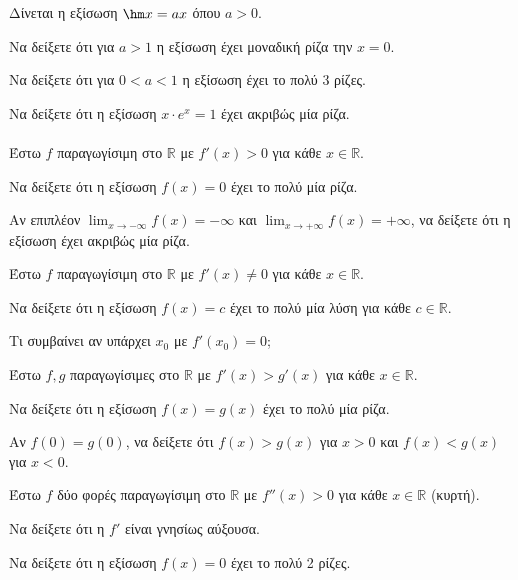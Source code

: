 \documentclass[11pt,a4paper,modern]{FFExercises}
\begin{document}
\askhsh
Δίνεται η εξίσωση $\hm x = ax$ όπου $a > 0$.
\begin{alist}
  \item Να δείξετε ότι για $a > 1$ η εξίσωση έχει μοναδική ρίζα την $x = 0$.
  \item Να δείξετε ότι για $0 < a < 1$ η εξίσωση έχει το πολύ 3 ρίζες.
\end{alist}

\askhsh
Να δείξετε ότι η εξίσωση $x \cdot e^x = 1$ έχει ακριβώς μία ρίζα.\\\\


\askhsh
Έστω $f$ παραγωγίσιμη στο $\mathbb{R}$ με $f'(x) > 0$ για κάθε $x \in \mathbb{R}$.
\begin{alist}
  \item Να δείξετε ότι η εξίσωση $f(x) = 0$ έχει το πολύ μία ρίζα.
  \item Αν επιπλέον $\displaystyle\lim_{x \to -\infty} f(x) = -\infty$ και $\displaystyle\lim_{x \to +\infty} f(x) = +\infty$, να δείξετε ότι η εξίσωση έχει ακριβώς μία ρίζα.
\end{alist}

\askhsh
Έστω $f$ παραγωγίσιμη στο $\mathbb{R}$ με $f'(x) \neq 0$ για κάθε $x \in \mathbb{R}$.
\begin{alist}
  \item Να δείξετε ότι η εξίσωση $f(x) = c$ έχει το πολύ μία λύση για κάθε $c \in \mathbb{R}$.
  \item Τι συμβαίνει αν υπάρχει $x_0$ με $f'(x_0) = 0$;
\end{alist}

\askhsh
Έστω $f, g$ παραγωγίσιμες στο $\mathbb{R}$ με $f'(x) > g'(x)$ για κάθε $x \in \mathbb{R}$.
\begin{alist}
  \item Να δείξετε ότι η εξίσωση $f(x) = g(x)$ έχει το πολύ μία ρίζα.
  \item Αν $f(0) = g(0)$, να δείξετε ότι $f(x) > g(x)$ για $x > 0$ και $f(x) < g(x)$ για $x < 0$.
\end{alist}

\askhsh
Έστω $f$ δύο φορές παραγωγίσιμη στο $\mathbb{R}$ με $f''(x) > 0$ για κάθε $x \in \mathbb{R}$ (κυρτή).
\begin{alist}
  \item Να δείξετε ότι η $f'$ είναι γνησίως αύξουσα.
  \item Να δείξετε ότι η εξίσωση $f(x) = 0$ έχει το πολύ 2 ρίζες.
\end{alist}
\end{document}
